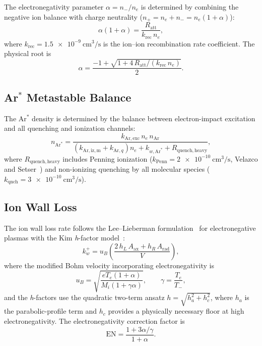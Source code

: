 \documentclass[11pt,a4paper]{report}
\newcommand{\Ar}{\mathrm{Ar}}
\newcommand{\Te}{T_e}
\begin{document}
The electronegativity parameter $\alpha = n_-/n_e$ is determined by combining the negative ion balance with charge neutrality ($n_+ = n_e + n_- = n_e(1+\alpha)$):
\begin{equation}
  \boxed{\alpha(1+\alpha) = \frac{R_\mathrm{att}}{k_\mathrm{rec}\,n_e},}
  \label{eq:alpha-quadratic}
\end{equation}
where $k_\mathrm{rec} = \SI{1.5e-9}{\centi\meter\cubed\per\second}$ is the ion--ion recombination rate coefficient.  The physical root is
\begin{equation}
  \alpha = \frac{-1 + \sqrt{1 + 4\,R_\mathrm{att}/(k_\mathrm{rec}\,n_e)}}{2}.
  \label{eq:alpha-solution}
\end{equation}

\subsection{Ar$^*$ Metastable Balance}

The Ar$^*$ density is determined by the balance between electron-impact excitation and all quenching and ionization channels:
\begin{equation}
  n_{\Ar^*} = \frac{k_{\Ar,\mathrm{exc}}\, n_e\, n_\Ar}{(k_{\Ar,\mathrm{iz,m}} + k_{\Ar,q})n_e + k_{w,\Ar^*} + R_\mathrm{quench,heavy}},
  \label{eq:Ar-star}
\end{equation}
where $R_\mathrm{quench,heavy}$ includes Penning ionization ($k_\mathrm{Penn} = \SI{2e-10}{\centi\meter\cubed\per\second}$, Velazco and Setser~\cite{Velazco1975}) and non-ionizing quenching by all molecular species ($k_\mathrm{qnch} = \SI{3e-10}{\centi\meter\cubed\per\second}$).

\subsection{Ion Wall Loss}

The ion wall loss rate follows the Lee--Lieberman formulation~\cite{Lee1995} for electronegative plasmas with the Kim \emph{h}-factor model~\cite{Kim2006}:
\begin{equation}
  k_w^+ = u_B \left( \frac{2\,h_L\,A_\mathrm{ax} + h_R\,A_\mathrm{rad}}{V}\right),
  \label{eq:ion-wall-loss}
\end{equation}
where the modified Bohm velocity incorporating electronegativity is
\begin{equation}
  u_B = \sqrt{\frac{e\Te(1+\alpha)}{M_i(1+\gamma\alpha)}}, \qquad \gamma = \frac{\Te}{T_-},
  \label{eq:Bohm-EN}
\end{equation}
and the \emph{h}-factors use the quadratic two-term ansatz $h = \sqrt{h_a^2 + h_c^2}$, where $h_a$ is the parabolic-profile term and $h_c$ provides a physically necessary floor at high electronegativity.  The electronegativity correction factor is
\begin{equation}
  \mathrm{EN} = \frac{1 + 3\alpha/\gamma}{1 + \alpha}.
\end{equation}
\end{document}
